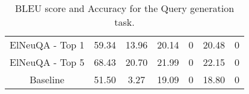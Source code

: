 \begin{table}[h!]
\begin{tabular}{|c|cc|cc|cc|}
    ElNeuQA - Top 1                  & 59.34                                                                               & 13.96                                                             & 20.14                                                                               & 0                                                                 & 20.48                                                                               & 0                                                                 \\
    ElNeuQA - Top 5                  & 68.43                                                                               & 20.70                                                              & 21.99                                                                               & 0                                                                 & 22.15                                                                               & 0                                                                 \\ \hline
    Baseline                         & 51.50                                                                                & 3.27                                                              & 19.09                                                                               & 0                                                                 & 18.80                                                                                & 0                                                                 \\ \hline
    \end{tabular}%
    \caption{BLEU score and Accuracy for the \SPARQL{} Query generation task.}
    \label{table:queryGenerationTestResults}
\end{table}

